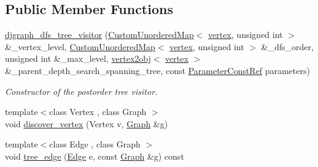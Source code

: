 \subsection*{Public Member Functions}
\begin{DoxyCompactItemize}
\item 
\hyperlink{structdjgraph__dfs__tree__visitor_ab2e0fa3a5366a2fccf73f5bd48066dde}{djgraph\+\_\+dfs\+\_\+tree\+\_\+visitor} (\hyperlink{custom__map_8hpp_ad1ed68f2ff093683ab1a33522b144adc}{Custom\+Unordered\+Map}$<$ \hyperlink{graph_8hpp_abefdcf0544e601805af44eca032cca14}{vertex}, unsigned int $>$ \&\+\_\+vertex\+\_\+level, \hyperlink{custom__map_8hpp_ad1ed68f2ff093683ab1a33522b144adc}{Custom\+Unordered\+Map}$<$ \hyperlink{graph_8hpp_abefdcf0544e601805af44eca032cca14}{vertex}, unsigned int $>$ \&\+\_\+dfs\+\_\+order, unsigned int \&\+\_\+max\+\_\+level, \hyperlink{structvertex2obj}{vertex2obj}$<$ \hyperlink{graph_8hpp_abefdcf0544e601805af44eca032cca14}{vertex} $>$ \&\+\_\+parent\+\_\+depth\+\_\+search\+\_\+spanning\+\_\+tree, const \hyperlink{Parameter_8hpp_a37841774a6fcb479b597fdf8955eb4ea}{Parameter\+Const\+Ref} parameters)
\begin{DoxyCompactList}\small\item\em Constructor of the postorder tree visitor. \end{DoxyCompactList}\item 
{\footnotesize template$<$class Vertex , class Graph $>$ }\\void \hyperlink{structdjgraph__dfs__tree__visitor_a99fec574c36c748c6772ddffcb6145b1}{discover\+\_\+vertex} (Vertex v, \hyperlink{structGraph}{Graph} \&g)
\item 
{\footnotesize template$<$class Edge , class Graph $>$ }\\void \hyperlink{structdjgraph__dfs__tree__visitor_ace65845190cbcfa9406dcb86355b3ab2}{tree\+\_\+edge} (\hyperlink{structEdge}{Edge} e, const \hyperlink{structGraph}{Graph} \&g) const
\end{DoxyCompactItemize}
